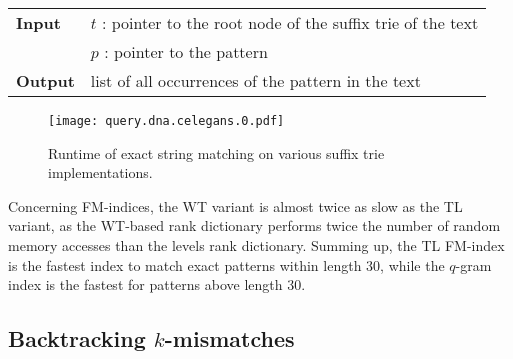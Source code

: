 \begin{figure*}[t]
\begin{center}
\begin{minipage}[t]{.8\textwidth}
\begin{algorithm}[H]
\begin{tabular}{ll}
\textbf{Input}  & $t$ : pointer to the root node of the suffix trie of the text\\
				& $p$ : pointer to the pattern\\
\textbf{Output} & list of all occurrences of the pattern in the text\\
\end{tabular}
\begin{algorithmic}[1]
	\State \Report {}
		\State {}
\EndIf
\end{algorithmic}
\label{alg:st-exact}
\end{algorithm}
\end{minipage}
\end{center}
\end{figure*}

\begin{figure}[b]
\begin{center}
\caption[Exact string matching runtime]{Runtime of exact string matching on various suffix trie implementations.}
\label{fig:query-dna-exact}
\texttt{[image: query.dna.celegans.0.pdf]}
\end{center}
\end{figure}


Concerning FM-indices, the WT variant is almost twice as slow as the TL variant, as the WT-based rank dictionary performs twice the number of random memory accesses than the levels rank dictionary.
Summing up, the TL FM-index is the fastest index to match exact patterns within length 30, while the $q$-gram index is the fastest for patterns above length 30.

%

\subsection{Backtracking $k$-mismatches}
\label{sec:index:algo:kmismatches}

